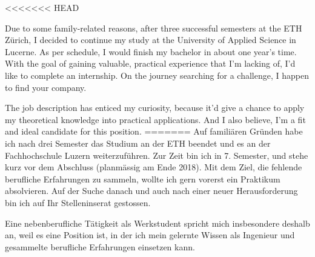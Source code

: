 \documentclass[11pt, a4paper]{awesome-cv}
\begin{document}
\makecvheader

\makelettertitle

\begin{cvletter}

<<<<<<< HEAD

Due to some family-related reasons, after three successful semesters at the ETH Zürich, I decided to continue my study at the University of Applied Science in Lucerne. As per schedule, I would finish my bachelor in about one year's time. With the goal of gaining valuable, practical experience that I'm lacking of, I'd like to complete an internship. On the journey searching for a challenge, I happen to find your company.


The job description has enticed my curiosity, because it'd give a chance to apply my theoretical knowledge into practical applications. And I also believe, I'm a fit and ideal candidate for this position.
=======
Auf familiären Gründen habe ich nach drei Semester das Studium an der ETH beendet und es an der Fachhochschule Luzern weiterzuführen. Zur Zeit bin ich in 7. Semester, und stehe kurz vor dem Abschluss (planmässig am Ende 2018). Mit dem Ziel, die fehlende berufliche Erfahrungen zu sammeln, wollte ich gern vorerst ein Praktikum absolvieren. Auf der Suche danach und auch nach einer neuer Herausforderung bin ich auf Ihr Stelleninserat gestossen.

Eine nebenberufliche Tätigkeit als Werkstudent spricht mich insbesondere deshalb an, weil es eine Position ist, in der ich mein gelernte Wissen als Ingenieur und gesammelte berufliche Erfahrungen einsetzen kann. 	
 

\end{cvletter}
\end{document}
